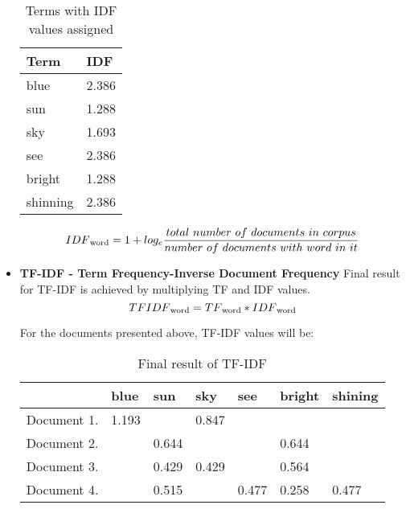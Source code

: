 \begin{itemize}
	\begin{table}[H]
		\centering
		\caption{Terms with IDF values assigned}
		\label{tf_idf_idf}
	\begin{tabular}{@{}ll@{}}
		\toprule
		Term     & IDF   \\ \midrule
		blue     & 2.386 \\
		sun      & 1.288 \\
		sky      & 1.693 \\
		see      & 2.386 \\
		bright   & 1.288 \\
		shinning & 2.386 \\ \bottomrule
	\end{tabular}
	\end{table}
	
		\[IDF\textsubscript{word}=1+log_e \frac{total\ number\ of\ documents\ in\ corpus}{number\ of\ documents\ with\ word\ in\ it}\]

	\item \textbf{TF-IDF - Term Frequency-Inverse Document Frequency}
	Final result for TF-IDF is achieved by multiplying TF and IDF values.
	\[TFIDF\textsubscript{word}=TF\textsubscript{word} * IDF\textsubscript{word}\]
	
	For the documents presented above, TF-IDF values will be:

	\begin{table}[H]
		\centering
		\caption{Final result of TF-IDF}
		\label{tf_idf}
		\begin{tabular}{lllllll}
			\hline
			& blue  & sun   & sky   & see   & bright & shining \\ \hline
			Document 1. & 1.193 &       & 0.847 &       &        &         \\
			Document 2. &       & 0.644 &       &       & 0.644  &         \\
			Document 3. &       & 0.429 & 0.429 &       & 0.564  &         \\
			Document 4. &       & 0.515 &       & 0.477 & 0.258  & 0.477   \\ \hline
		\end{tabular}
	\end{table}
	
\end{itemize}

